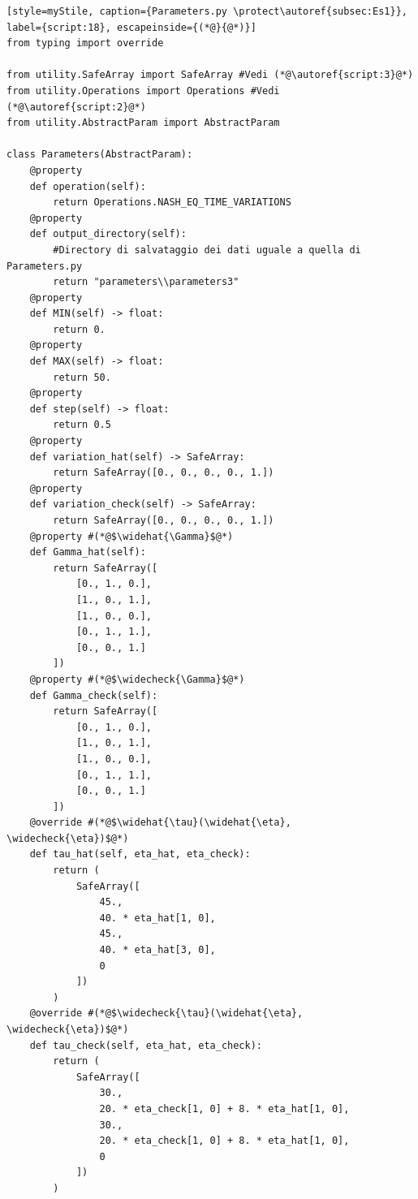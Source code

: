 \begin{lstlisting}[style=myStile, caption={Parameters.py \protect\autoref{subsec:Es1}}, label={script:18}, escapeinside={(*@}{@*)}]
from typing import override

from utility.SafeArray import SafeArray #Vedi (*@\autoref{script:3}@*)
from utility.Operations import Operations #Vedi (*@\autoref{script:2}@*)
from utility.AbstractParam import AbstractParam

class Parameters(AbstractParam):
    @property
    def operation(self):
        return Operations.NASH_EQ_TIME_VARIATIONS
    @property
    def output_directory(self):
        #Directory di salvataggio dei dati uguale a quella di Parameters.py
        return "parameters\\parameters3" 
    @property
    def MIN(self) -> float:
        return 0.
    @property
    def MAX(self) -> float:
        return 50.
    @property
    def step(self) -> float:
        return 0.5
    @property
    def variation_hat(self) -> SafeArray:
        return SafeArray([0., 0., 0., 0., 1.])
    @property
    def variation_check(self) -> SafeArray:
        return SafeArray([0., 0., 0., 0., 1.])
    @property #(*@$\widehat{\Gamma}$@*)
    def Gamma_hat(self):
        return SafeArray([
            [0., 1., 0.],
            [1., 0., 1.],
            [1., 0., 0.],
            [0., 1., 1.],
            [0., 0., 1.]
        ])
    @property #(*@$\widecheck{\Gamma}$@*)
    def Gamma_check(self):
        return SafeArray([
            [0., 1., 0.],
            [1., 0., 1.],
            [1., 0., 0.],
            [0., 1., 1.],
            [0., 0., 1.]
        ])
    @override #(*@$\widehat{\tau}(\widehat{\eta}, \widecheck{\eta})$@*)
    def tau_hat(self, eta_hat, eta_check):
        return (
            SafeArray([
                45.,
                40. * eta_hat[1, 0],
                45.,
                40. * eta_hat[3, 0],
                0
            ])
        )
    @override #(*@$\widecheck{\tau}(\widehat{\eta}, \widecheck{\eta})$@*)
    def tau_check(self, eta_hat, eta_check):
        return (
            SafeArray([
                30.,
                20. * eta_check[1, 0] + 8. * eta_hat[1, 0],
                30.,
                20. * eta_check[1, 0] + 8. * eta_hat[1, 0],
                0
            ])
        )
\end{lstlisting}

